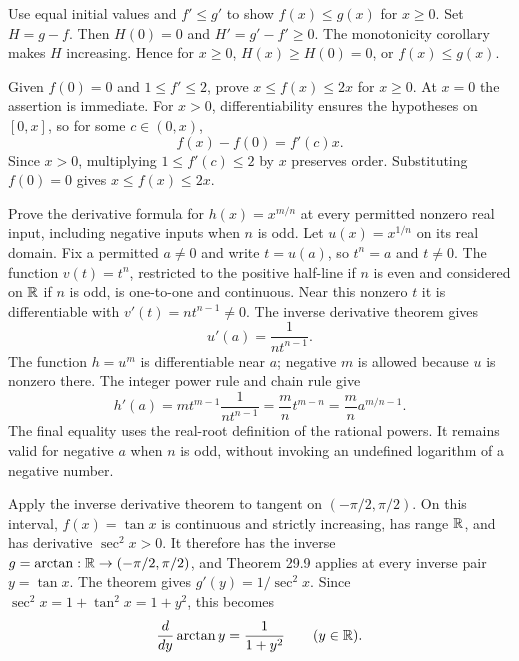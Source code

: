 \goal Use equal initial values and $f'\le g'$ to show $f(x)\le g(x)$ for $x\ge0$.
Set $H=g-f$. Then $H(0)=0$ and $H'=g'-f'\ge0$. The monotonicity corollary makes $H$ increasing. Hence for $x\ge0$, $H(x)\ge H(0)=0$, or $f(x)\le g(x)$.

\goal Given $f(0)=0$ and $1\le f'\le2$, prove $x\le f(x)\le2x$ for $x\ge0$.
At $x=0$ the assertion is immediate. For $x>0$, differentiability ensures the hypotheses on $[0,x]$, so for some $c\in(0,x)$,
\[
 f(x)-f(0)=f'(c)x.
\]
Since $x>0$, multiplying $1\le f'(c)\le2$ by $x$ preserves order. Substituting $f(0)=0$ gives $x\le f(x)\le2x$.

\goal Prove the derivative formula for $h(x)=x^{m/n}$ at every permitted nonzero real input, including negative inputs when $n$ is odd.
Let $u(x)=x^{1/n}$ on its real domain. Fix a permitted $a\ne0$ and write $t=u(a)$, so $t^n=a$ and $t\ne0$. The function $v(t)=t^n$, restricted to the positive half-line if $n$ is even and considered on $\mathbb{R}$ if $n$ is odd, is one-to-one and continuous. Near this nonzero $t$ it is differentiable with $v'(t)=nt^{n-1}\ne0$. The inverse derivative theorem gives
\[
 u'(a)=\frac1{nt^{n-1}}.
\]
The function $h=u^m$ is differentiable near $a$; negative $m$ is allowed because $u$ is nonzero there. The integer power rule and chain rule give
\[
 h'(a)=m t^{m-1}\frac1{nt^{n-1}}
       =\frac mn t^{m-n}=\frac mn a^{m/n-1}.
\]
The final equality uses the real-root definition of the rational powers. It remains valid for negative $a$ when $n$ is odd, without invoking an undefined logarithm of a negative number.

\goal Apply the inverse derivative theorem to tangent on $(-\pi/2,\pi/2)$.
On this interval, $f(x)=\tan x$ is continuous and strictly increasing, has range $\mathbb{R}$, and has derivative $\sec^2x>0$. It therefore has the inverse $g=\arctan:\mathbb{R}\to(-\pi/2,\pi/2)$, and Theorem 29.9 applies at every inverse pair $y=\tan x$.
The theorem gives $g'(y)=1/\sec^2x$. Since $\sec^2x=1+\tan^2x=1+y^2$, this becomes
\[
 \frac{d}{dy}\arctan y=\frac1{1+y^2}\qquad(y\in\mathbb{R}).
\]

